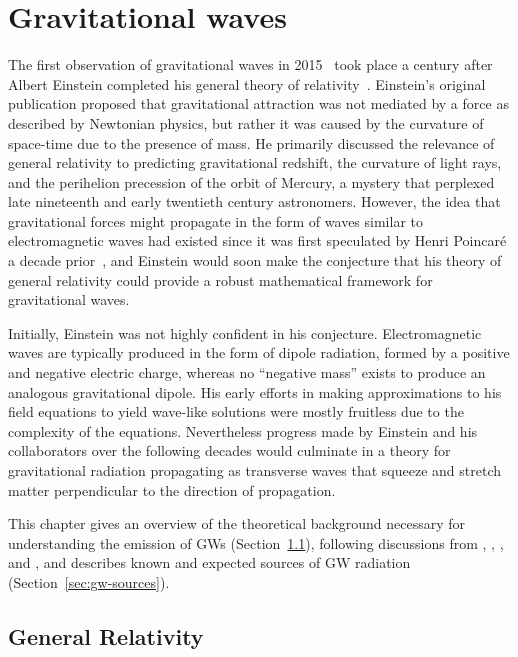 \chapter{Gravitational waves}\label{ch:gw}

The first observation of gravitational waves in 2015~\citep{gw150914} took place a century after Albert Einstein completed his general theory of relativity~\citep{Einstein_1916}.
Einstein's original publication proposed that gravitational attraction was not mediated by a force as described by Newtonian physics, but rather it was caused by the curvature of space-time due to the presence of mass.
He primarily discussed the relevance of general relativity to predicting gravitational redshift, the curvature of light rays, and the perihelion precession of the orbit of Mercury, a mystery that perplexed late nineteenth and early twentieth century astronomers.
However, the idea that gravitational forces might propagate in the form of waves similar to electromagnetic waves had existed since it was first speculated by Henri Poincar\'e a decade prior~\citep{Poincare_1905}, and Einstein would soon make the conjecture that his theory of general relativity could provide a robust mathematical framework for gravitational waves.

Initially, Einstein was not highly confident in his conjecture.
Electromagnetic waves are typically produced in the form of dipole radiation, formed by a positive and negative electric charge, whereas no ``negative mass'' exists to produce an analogous gravitational dipole.
His early efforts in making approximations to his field equations to yield wave-like solutions were mostly fruitless due to the complexity of the equations.
Nevertheless progress made by Einstein and his collaborators over the following decades would culminate in a theory for gravitational radiation propagating as transverse waves that squeeze and stretch matter perpendicular to the direction of propagation.

This chapter gives an overview of the theoretical background necessary for understanding the emission of \acp{GW} (Section~\ref{sec:gw-gr}), following discussions from \citet{Creighton_2011}, \citet{Hartle_2003}, \citet{Jaranowski_2009}, and \citet{Misner_1973}, and describes known and expected sources of \ac{GW} radiation (Section~\ref{sec:gw-sources}).


\section{General Relativity}\label{sec:gw-gr}

